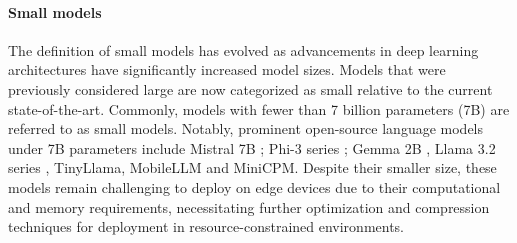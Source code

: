 \vspace{-1em}
\paragraph{Small models}
The definition of small models has evolved as advancements in deep learning architectures have significantly increased model sizes. Models that were previously considered large are now categorized as small relative to the current state-of-the-art. Commonly, models with fewer than 7 billion parameters (7B) are referred to as small models. Notably, prominent open-source language models under 7B parameters include Mistral 7B \citep{jiang2023mistral}; Phi-3 series \citep{abdin2024phi}; Gemma 2B \citep{team2023gemini}, Llama 3.2 series \citep{dubey2024llama}, TinyLlama\citep{zhang2024tinyllama}, MobileLLM\citep{liu2024mobilellm} and MiniCPM\citep{hu2024minicpm}. Despite their smaller size, these models remain challenging to deploy on edge devices due to their computational and memory requirements, necessitating further optimization and compression techniques for deployment in resource-constrained environments.